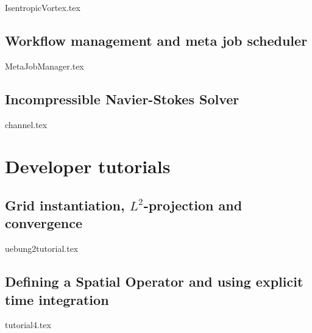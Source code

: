 \documentclass[a4paper,10pt]{report} %
\begin{document}
\label{CNS}
{IsentropicVortex.tex}

\chapter{Workflow management and meta job scheduler}
\label{sec:WorkflowMgm}
{MetaJobManager.tex}


\chapter{Incompressible Navier-Stokes Solver}

{channel.tex}

\part{Developer tutorials}
\label{sec:Tutorial}

\chapter{Grid instantiation, $L^2$-projection and convergence}
\label{GridInstantiation}
{uebung2tutorial.tex}


\chapter{Defining a Spatial Operator and using explicit time integration}
\label{SpatialOperator}
{tutorial4.tex}
\end{document}
